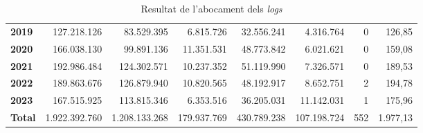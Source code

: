 \begin{table}[h!]
\begin{adjustbox}{width=1.5\textwidth, center}
\begin{tabular}{|l|r|r|r|r|r|r|r|}
            \textbf{2019}       & 127.218.126           & 83.529.395            & 6.815.726                 & 32.556.241            & 4.316.764                 & 0             & 126,85        \\
            \textbf{2020}       & 166.038.130           & 99.891.136            & 11.351.531                & 48.773.842            & 6.021.621                 & 0             & 159,08        \\
            \textbf{2021}       & 192.986.484           & 124.302.571           & 10.237.352                & 51.119.990            & 7.326.571                 & 0             & 189,53        \\
            \textbf{2022}       & 189.863.676           & 126.879.940           & 10.820.565                & 48.192.917            & 8.652.751                 & 2             & 194,78        \\
            \textbf{2023}       & 167.515.925           & 113.815.346           & 6.353.516                 & 36.205.031            & 11.142.031                & 1             & 175,96        \\
            \midrule
            \textbf{Total}      & 1.922.392.760         & 1.208.133.268         & 179.937.769               & 430.789.238           & 107.198.724               & 552           & 1.977,13      \\
            \bottomrule
        \end{tabular}
    \end{adjustbox}
    \caption{Resultat de l'abocament dels \textit{\gls{log}s}}
    \label{tab:logs-table}
\end{table}
